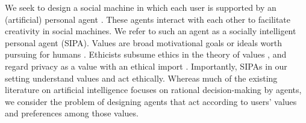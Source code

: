 We seek to design a social machine in which each user is supported by an (artificial) personal agent \citep{Murukannaiah-AAMAS14-Xipho}. 
These agents interact with each other to facilitate creativity in social machines. 
We refer to such an agent as a socially intelligent personal agent (SIPA).
% 
Values are broad motivational goals or ideals worth pursuing for humans \citep{schwartz2012overview,Dechesne-AIL13-Norms+Values}.
Ethicists subsume ethics in the theory of values \citep{Friedman-2008-value-sensitive-design},  
and regard privacy as a value with an ethical import \citep{Langheinrich-01:privacy,Taylor-2002-PrivacyAutonomy}. 
% 
Importantly, SIPAs in our setting understand values and act ethically. 
Whereas much of the existing literature on artificial intelligence focuses on rational decision-making by agents, we consider the problem of designing agents that act according to users' values and preferences among those values.

